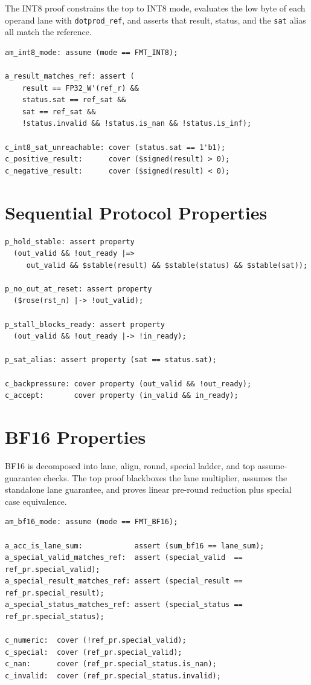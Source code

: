 \documentclass[11pt,oneside]{report}
\begin{document}
The INT8 proof constrains the top to INT8 mode, evaluates the low byte of each
operand lane with \texttt{dotprod\_ref}, and asserts that result, status, and the
\texttt{sat} alias all match the reference.

\begin{lstlisting}[style=sv,caption={INT8 top equivalence property}]
am_int8_mode: assume (mode == FMT_INT8);

a_result_matches_ref: assert (
    result == FP32_W'(ref_r) &&
    status.sat == ref_sat &&
    sat == ref_sat &&
    !status.invalid && !status.is_nan && !status.is_inf);

c_int8_sat_unreachable: cover (status.sat == 1'b1);
c_positive_result:      cover ($signed(result) > 0);
c_negative_result:      cover ($signed(result) < 0);
\end{lstlisting}

\section{Sequential Protocol Properties}

\begin{lstlisting}[style=sv,caption={Sequential ready/valid protocol properties}]
p_hold_stable: assert property
  (out_valid && !out_ready |=>
     out_valid && $stable(result) && $stable(status) && $stable(sat));

p_no_out_at_reset: assert property
  ($rose(rst_n) |-> !out_valid);

p_stall_blocks_ready: assert property
  (out_valid && !out_ready |-> !in_ready);

p_sat_alias: assert property (sat == status.sat);

c_backpressure: cover property (out_valid && !out_ready);
c_accept:       cover property (in_valid && in_ready);
\end{lstlisting}

\section{BF16 Properties}

BF16 is decomposed into lane, align, round, special ladder, and top
assume-guarantee checks. The top proof blackboxes the lane multiplier, assumes
the standalone lane guarantee, and proves linear pre-round reduction plus
special case equivalence.

\begin{lstlisting}[style=sv,caption={BF16 top assume-guarantee properties}]
am_bf16_mode: assume (mode == FMT_BF16);

a_acc_is_lane_sum:            assert (sum_bf16 == lane_sum);
a_special_valid_matches_ref:  assert (special_valid  == ref_pr.special_valid);
a_special_result_matches_ref: assert (special_result == ref_pr.special_result);
a_special_status_matches_ref: assert (special_status == ref_pr.special_status);

c_numeric:  cover (!ref_pr.special_valid);
c_special:  cover (ref_pr.special_valid);
c_nan:      cover (ref_pr.special_status.is_nan);
c_invalid:  cover (ref_pr.special_status.invalid);
\end{lstlisting}
\end{document}
